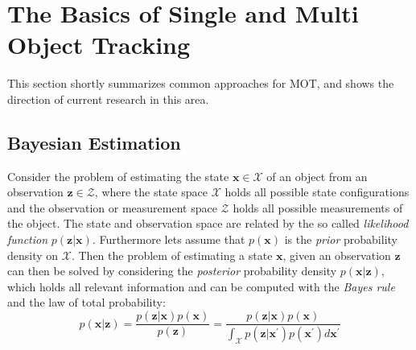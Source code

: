 \documentclass[12pt,a4paper]{article}
\begin{document}







\section{The Basics of Single and Multi Object Tracking}
This section shortly summarizes common approaches for MOT, and shows the direction of current research in this area. 

\subsection{Bayesian Estimation}
\label{bayesian_estimation}

Consider the problem of estimating the state $\mathbf{x} \in \mathcal{X}$ of an object from an observation $\mathbf{z} \in \mathcal{Z}$, where the state space $\mathcal{X}$ holds all possible state configurations and the observation or measurement space $\mathcal{Z}$ holds all possible measurements of the object. The state and observation space are related by the so called \emph{likelihood function} $p(\mathbf{z} | \mathbf{x})$. Furthermore lets assume that $p(\mathbf{x})$ is the \emph{prior} probability density on $\mathcal{X}$. Then the problem of estimating a state $\mathbf{x}$, given an observation $\mathbf{z}$ can then be solved by considering the \emph{posterior} probability density $p(\mathbf{x} | \mathbf{z})$, which holds all relevant information and can be computed with the \emph{Bayes rule} and the law of total probability:
$$
p(\mathbf{x}|\mathbf{z}) = \frac{p(\mathbf{z}|\mathbf{x})p(\mathbf{x})}{p(\mathbf{z})} =  \frac{p(\mathbf{z}|\mathbf{x})p(\mathbf{x})}{ \int_{\mathcal{X}} p(\mathbf{z}|\mathbf{x}^\prime)p(\mathbf{x}^\prime)d\mathbf{x}^\prime}
$$
\end{document}
